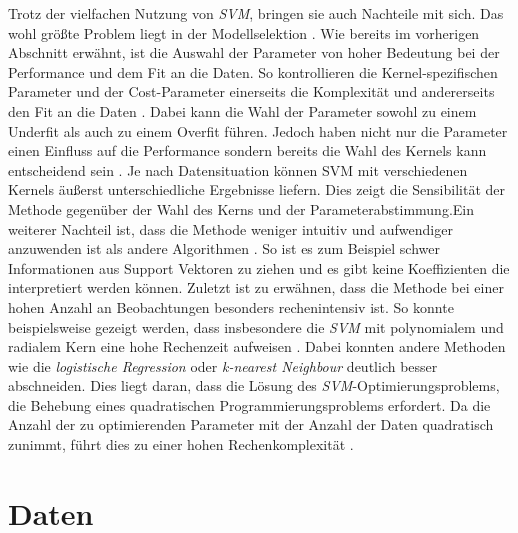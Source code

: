 \documentclass[
]{article}
\begin{document}
Trotz der vielfachen Nutzung von \textit{SVM}, bringen sie auch
Nachteile mit sich. Das wohl größte Problem liegt in der Modellselektion
\parencite{bennettSupportVectorMachines2000}. Wie bereits im vorherigen
Abschnitt erwähnt, ist die Auswahl der Parameter von hoher Bedeutung bei
der Performance und dem Fit an die Daten. So kontrollieren die
Kernel-spezifischen Parameter und der Cost-Parameter einerseits die
Komplexität und andererseits den Fit an die Daten
\parencite{kuhnAppliedPredictiveModeling2013}. Dabei kann die Wahl der
Parameter sowohl zu einem Underfit als auch zu einem Overfit führen.
Jedoch haben nicht nur die Parameter einen Einfluss auf die Performance
sondern bereits die Wahl des Kernels kann entscheidend sein
\parencite{burgesTutorialSupportVector1998}. Je nach Datensituation
können SVM mit verschiedenen Kernels äußerst unterschiedliche Ergebnisse
liefern. Dies zeigt die Sensibilität der Methode gegenüber der Wahl des
Kerns und der Parameterabstimmung.\newline Ein weiterer Nachteil ist,
dass die Methode weniger intuitiv und aufwendiger anzuwenden ist als
andere Algorithmen \parencite{bennettSupportVectorMachines2000}. So ist
es zum Beispiel schwer Informationen aus Support Vektoren zu ziehen und
es gibt keine Koeffizienten die interpretiert werden können.\newline
Zuletzt ist zu erwähnen, dass die Methode bei einer hohen Anzahl an
Beobachtungen besonders rechenintensiv ist. So konnte beispielsweise
gezeigt werden, dass insbesondere die \textit{SVM} mit polynomialem und
radialem Kern eine hohe Rechenzeit aufweisen
\parencite{scholzComparisonClassificationMethods2021}. Dabei konnten
andere Methoden wie die \textit{logistische Regression} oder
\textit{k-nearest Neighbour} deutlich besser abschneiden. Dies liegt
daran, dass die Lösung des \textit{SVM}-Optimierungsproblems, die
Behebung eines quadratischen Programmierungsproblems erfordert. Da die
Anzahl der zu optimierenden Parameter mit der Anzahl der Daten
quadratisch zunimmt, führt dies zu einer hohen Rechenkomplexität
\parencite{kecmanSupportVectorMachines2005}.

\section{Daten}
\end{document}
